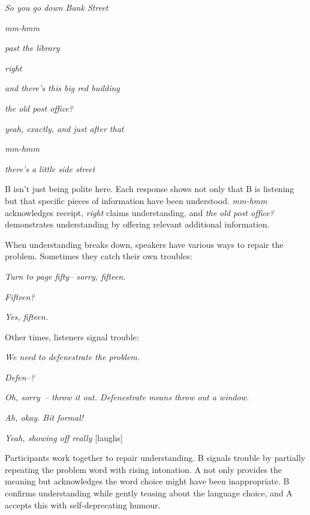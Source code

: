 \ea
\begin{dialogue}
\item[A] \textit{So you go down Bank Street}
\item[B] \textit{mm-hmm}
\item[A] \textit{past the library}
\item[B] \textit{right}
\item[A] \textit{and there's this big red building}
\item[B] \textit{the old post office?}
\item[A] \textit{yeah, exactly, and just after that}
\item[B] \textit{mm-hmm}
\item[A] \textit{there's a little side street}
\end{dialogue}
\z
B isn't just being polite here. Each response shows not only that B is listening but that specific pieces of information have been understood. \textit{mm-hmm} acknowledges receipt, \textit{right} claims understanding, and \textit{the old post office?} demonstrates understanding by offering relevant additional information.

When understanding breaks down, speakers have various ways to repair the problem. Sometimes they catch their own troubles:

\ea
\begin{dialogue}
\item[Teacher] \textit{Turn to page fifty-- sorry, fifteen.}
\item[Student] \textit{Fifteen?}
\item[Teacher] \textit{Yes, fifteen.}
\end{dialogue}
\z
Other times, listeners signal trouble:

\ea
\begin{dialogue}
\item[A] \textit{We need to defenestrate the problem.}
\item[B] \textit{Defen--?}
\item[A] \textit{Oh, sorry~-- throw it out. Defenestrate means throw out a window.}
\item[B] \textit{Ah, okay. Bit formal!}
\item[A] \textit{Yeah, showing off really} [laughs]
\end{dialogue}
\z

Participants work together to repair understanding. B signals trouble by partially repeating the problem word with rising intonation. A not only provides the meaning but acknowledges the word choice might have been inappropriate. B confirms understanding while gently teasing about the language choice, and A accepts this with self-deprecating humour.

